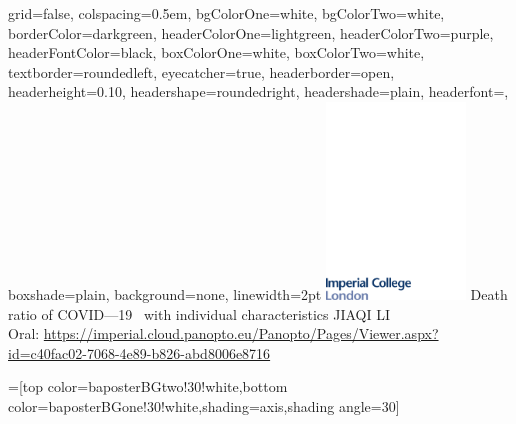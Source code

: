 \documentclass[landscape,final,a0paper]{baposter}
\begin{document}
\newlength{\leftimgwidth}
\begin{poster}%
  {
  grid=false,
  colspacing=0.5em,
  bgColorOne=white,
  bgColorTwo=white,
  borderColor=darkgreen,
  headerColorOne=lightgreen,
  headerColorTwo=purple,
  headerFontColor=black,
 boxColorOne=white,
 boxColorTwo=white,
  textborder=roundedleft,
  eyecatcher=true,
  headerborder=open,
  headerheight=0.10\textheight,
  headershape=roundedright,
  headershade=plain,
  headerfont=\Large\textsf, %
  boxshade=plain,
  background=none,
  linewidth=2pt
  }
  {\includegraphics[width=10em]{imperial.pdf}} %
  {\sf %
  Death ratio of COVID—19 \ with individual characteristics }
  {\sf %
  \vspace{1em} 
	JIAQI LI\\
	{\smaller Oral:  \url{https://imperial.cloud.panopto.eu/Panopto/Pages/Viewer.aspx?id=c40fac02-7068-4e89-b826-abd8006e8716}}
  }
  { %
  }

  =[top color=baposterBGtwo!30!white,bottom color=baposterBGone!30!white,shading=axis,shading angle=30]


\end{poster}
\end{document}
